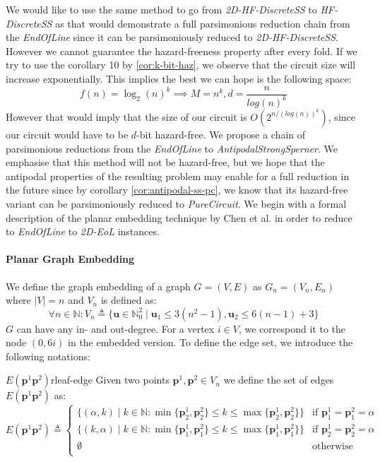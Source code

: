 We would like to use the same method to go from
\textit{2D-HF-DiscreteSS} to \textit{HF-DiscreteSS}
as that would demonstrate a full parsimonious reduction chain from
the \textit{EndOfLine} since it can be parsimoniously reduced to \textit{2D-HF-DiscreteSS}.
However we cannot guarantee
the hazard-freeness property after every fold.
If we try to use the corollary 10 by \ref{cor:k-bit-haz},
we observe that the circuit size will increase exponentially.
This implies the best we can hope is the following space:
$$
    f(n) = \log_2(n)^k \implies M = n^k, d = \frac{n}{log(n)^k}
$$
However that would imply that the size of our circuit is $O\left(2^{n/(log(n))^k}\right)$,
since our circuit would have to be $d$-bit hazard-free.
We propose a chain of parsimonious reductions from the \textit{EndOfLine}
to \textit{AntipodalStrongSperner}. We emphasise that this method will not be hazard-free,
but we hope that the antipodal properties of the resulting problem may enable for a full reduction in the future
since by corollary \ref{cor:antipodal-ss-pc}, we know that its hazard-free variant can be parsimoniously reduced to \textit{PureCircuit}.
We begin with a formal description of the planar embedding technique by Chen et al. \cite{chen_Complexity2DDiscrete_2009} in order to reduce to \textit{EndOfLine}
to \textit{2D-EoL} instances.

\paragraph{Planar Graph Embedding}\label{par:chap-2:planar-graph-embedding}
We define the graph embedding of a graph $G = (V,E)$ as $G_n = (V_n, E_n)$ where $|V| = n$ and $V_n$ is defined as:
\[
    \forall n \in \mathbb{N}:  V_n \triangleq \Big\{\mathbf{u} \in \mathbb{N}_0^2\mid \mathbf{u}_1 \leq 3(n^2 - 1) , \mathbf{u}_2 \leq 6(n - 1) + 3 \Big\}
\]
$G$ can have any in- and out-degree.
For a vertex $i \in V$, we correspond it to the node $(0, 6i)$ in the embedded version.
To define the edge set, we introduce the following notations:

\begin{definitionbox}{$E(\mathbf{p}^1\mathbf{p}^2 )$}{rleaf-edge}
    Given two points $\mathbf{p}^1, \mathbf{p}^2 \in V_n$ we define the set of edges
    $E(\mathbf{p}^1\mathbf{p}^2)$ as:
    $$
        E(\mathbf{p}^1 \mathbf{p}^2) \triangleq \begin{cases}
            \{(\alpha, k) \mid k \in \mathbb{N} : \min\{\mathbf{p}^1_2, \mathbf{p}^2_2\} \leq k  \leq \max\{\mathbf{p}^1_2, \mathbf{p}^2_2\}\} & \text{if }\mathbf{p}^1_1 = \mathbf{p}^2_1 = \alpha \\
            \{(k, \alpha) \mid k \in \mathbb{N} : \min\{\mathbf{p}^1_1, \mathbf{p}^2_1\} \leq k  \leq \max\{\mathbf{p}^1_1, \mathbf{p}^2_1\}\} & \text{if }\mathbf{p}^1_2 = \mathbf{p}^2_2 = \alpha \\
            \emptyset                                                                                                                          & \text{otherwise}                                   \\
        \end{cases}
    $$
\end{definitionbox}

